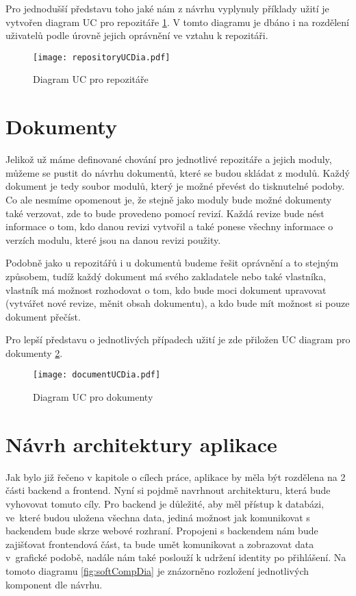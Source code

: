 Pro jednodušší představu toho jaké nám z návrhu vyplynuly příklady užití je vytvořen diagram UC pro repozitáře \ref{fig:repositoryUC}. V tomto diagramu je dbáno i na rozdělení
uživatelů podle úrovně jejich oprávnění ve vztahu k repozitáři.

\begin{figure}[H]
    \centering
    \texttt{[image: repositoryUCDia.pdf]}
    \caption{Diagram UC pro repozitáře}
    \label{fig:repositoryUC}
\end{figure}

\section{Dokumenty}

Jelikož už máme definované chování pro jednotlivé repozitáře a jejich moduly, můžeme se pustit do návrhu dokumentů, které se budou skládat z modulů. Každý
dokument je tedy soubor modulů, který je možné převést do tisknutelné podoby. Co ale nesmíme opomenout je, že stejně jako moduly bude možné dokumenty také
verzovat, zde to bude provedeno pomocí revizí. Každá revize bude nést informace o tom, kdo danou revizi vytvořil a také ponese všechny informace o verzích
modulu, které jsou na danou revizi použity.

Podobně jako u repozitářů i u dokumentů budeme řešit oprávnění a to stejným způsobem, tudíž každý dokument má svého zakladatele nebo také vlastníka,
vlastník má možnost rozhodovat o tom, kdo bude moci dokument upravovat (vytvářet nové revize, měnit obsah dokumentu), a kdo bude mít možnost si pouze dokument
přečíst.

Pro lepší představu o jednotlivých případech užití je zde přiložen UC diagram pro dokumenty \ref{fig:documentUC}.

\begin{figure}[H]
    \centering
    \texttt{[image: documentUCDia.pdf]}
    \caption{Diagram UC pro dokumenty}
    \label{fig:documentUC}
\end{figure}

\section{Návrh architektury aplikace}

Jak bylo již řečeno v kapitole o cílech práce, aplikace by měla být rozdělena na 2 části backend a frontend. Nyní si pojdmě navrhnout architekturu, která bude
vyhovovat tomuto cíly. Pro backend je důležité, aby měl přístup k databázi, ve~které budou uložena všechna data, jediná možnost jak komunikovat s backendem bude
skrze webové rozhraní. Propojeni s backendem nám bude zajišťovat frontendová část, ta bude umět komunikovat a zobrazovat data v~grafické podobě, nadále nám také
poslouží k udržení identity po přihlášení. Na tomoto diagramu \ref{fig:softCompDia} je znázorněno rozložení jednotlivých komponent dle návrhu.

